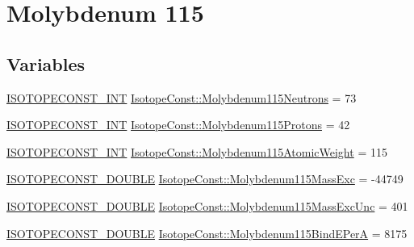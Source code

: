 \hypertarget{group___isotope_const-_molybdenum-_mo115}{}\section{Molybdenum 115}
\label{group___isotope_const-_molybdenum-_mo115}
\subsection*{Variables}
\begin{DoxyCompactItemize}
\item 
\mbox{\hyperlink{group___isotope_const-_macros_ga5f18360b3e99483a35c32d789e62621c}{I\+S\+O\+T\+O\+P\+E\+C\+O\+N\+S\+T\+\_\+\+I\+NT}} \mbox{\hyperlink{group___isotope_const-_molybdenum-_mo115_ga23ebf15faa437ba15dbdcffe98b1a5ee}{Isotope\+Const\+::\+Molybdenum115\+Neutrons}} = 73
\item 
\mbox{\hyperlink{group___isotope_const-_macros_ga5f18360b3e99483a35c32d789e62621c}{I\+S\+O\+T\+O\+P\+E\+C\+O\+N\+S\+T\+\_\+\+I\+NT}} \mbox{\hyperlink{group___isotope_const-_molybdenum-_mo115_gae054f368b071ea203b0e046570ff2114}{Isotope\+Const\+::\+Molybdenum115\+Protons}} = 42
\item 
\mbox{\hyperlink{group___isotope_const-_macros_ga5f18360b3e99483a35c32d789e62621c}{I\+S\+O\+T\+O\+P\+E\+C\+O\+N\+S\+T\+\_\+\+I\+NT}} \mbox{\hyperlink{group___isotope_const-_molybdenum-_mo115_gacf3d9f0f930612a9f69f4e3cb88c1e31}{Isotope\+Const\+::\+Molybdenum115\+Atomic\+Weight}} = 115
\item 
\mbox{\hyperlink{group___isotope_const-_macros_ga8f45a7272ce02c0b4c65c44636ed719a}{I\+S\+O\+T\+O\+P\+E\+C\+O\+N\+S\+T\+\_\+\+D\+O\+U\+B\+LE}} \mbox{\hyperlink{group___isotope_const-_molybdenum-_mo115_gaffb5015d3066c824b0ad4ffa179339a6}{Isotope\+Const\+::\+Molybdenum115\+Mass\+Exc}} = -\/44749
\item 
\mbox{\hyperlink{group___isotope_const-_macros_ga8f45a7272ce02c0b4c65c44636ed719a}{I\+S\+O\+T\+O\+P\+E\+C\+O\+N\+S\+T\+\_\+\+D\+O\+U\+B\+LE}} \mbox{\hyperlink{group___isotope_const-_molybdenum-_mo115_ga65b4117fa1b351f16aa84b47082558f1}{Isotope\+Const\+::\+Molybdenum115\+Mass\+Exc\+Unc}} = 401
\item 
\mbox{\hyperlink{group___isotope_const-_macros_ga8f45a7272ce02c0b4c65c44636ed719a}{I\+S\+O\+T\+O\+P\+E\+C\+O\+N\+S\+T\+\_\+\+D\+O\+U\+B\+LE}} \mbox{\hyperlink{group___isotope_const-_molybdenum-_mo115_gaf196c91535e372289780299d058b1778}{Isotope\+Const\+::\+Molybdenum115\+Bind\+E\+PerA}} = 8175
\item 

\end{DoxyCompactItemize}
